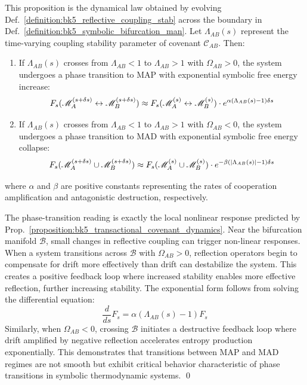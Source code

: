 \begin{proposition} 
\label{proposition:bk5_transactional_covenant_dynamics}
This proposition is the dynamical law obtained by evolving Def.~\ref{definition:bk5_reflective_coupling_stab} across the boundary in Def.~\ref{definition:bk5_symbolic_bifurcation_man}.
Let $\Lambda_{AB}(s)$ represent the time-varying coupling stability parameter of covenant $\mathcal{C}_{AB}$. Then:
\begin{enumerate}
  \item[(i)] If $\Lambda_{AB}(s)$ crosses from $\Lambda_{AB} < 1$ to $\Lambda_{AB} > 1$ with $\Omega_{AB} > 0$, the system undergoes a phase transition to MAP with exponential symbolic free energy increase:
  \begin{equation}
  F_s(\mathscr{M}_A^{(s+\delta s)} \leftrightarrow \mathscr{M}_B^{(s+\delta s)}) \approx F_s(\mathscr{M}_A^{(s)} \leftrightarrow \mathscr{M}_B^{(s)}) \cdot e^{\alpha(\Lambda_{AB}(s)-1) \delta s}
  \end{equation}
  \item[(ii)] If $\Lambda_{AB}(s)$ crosses from $\Lambda_{AB} < 1$ to $\Lambda_{AB} > 1$ with $\Omega_{AB} < 0$, the system undergoes a phase transition to MAD with exponential symbolic free energy collapse:
  \begin{equation}
  F_s(\mathscr{M}_A^{(s+\delta s)} \cup \mathscr{M}_B^{(s+\delta s)}) \approx F_s(\mathscr{M}_A^{(s)} \cup \mathscr{M}_B^{(s)}) \cdot e^{-\beta(|\Lambda_{AB}(s)|-1) \delta s}
  \end{equation}
\end{enumerate}
\noindent where $\alpha$ and $\beta$ are positive constants representing the rates of cooperation amplification and antagonistic destruction, respectively.
\end{proposition}
\begin{demonstratio}
\label{demonstratio:bk5_transitory_phasing}
The phase-transition reading is exactly the local nonlinear response predicted by Prop.~\ref{proposition:bk5_transactional_covenant_dynamics}.
Near the bifurcation manifold $\mathcal{B}$, small changes in reflective coupling can trigger non-linear responses. When a system transitions across $\mathcal{B}$ with $\Omega_{AB} > 0$, reflection operators begin to compensate for drift more effectively than drift can destabilize the system. This creates a positive feedback loop where increased stability enables more effective reflection, further increasing stability.
The exponential form follows from solving the differential equation:
\begin{equation}
\frac{d}{ds}F_s = \alpha(\Lambda_{AB}(s)-1)F_s
\end{equation}
Similarly, when $\Omega_{AB} < 0$, crossing $\mathcal{B}$ initiates a destructive feedback loop where drift amplified by negative reflection accelerates entropy production exponentially. This demonstrates that transitions between MAP and MAD regimes are not smooth but exhibit critical behavior characteristic of phase transitions in symbolic thermodynamic systems. \qed
\end{demonstratio}
